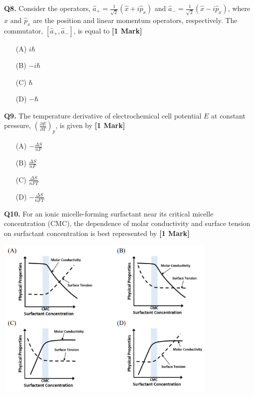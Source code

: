 \documentclass[11pt]{article}
\newcommand{\questiona}[2]{
    \noindent\textbf{Q#2.} #1 \hfill \textbf{[1 Mark]}
}
\begin{document}
\questiona{Consider the operators, \(\hat{a}_+ = \frac{1}{\sqrt{2}} (\hat{x} + i\hat{p}_x)\) and \(\hat{a}_- = \frac{1}{\sqrt{2}} (\hat{x} - i\hat{p}_x)\), where \(\hat{x}\) and \(\hat{p}_x\) are the position and linear momentum operators, respectively. The commutator, \([\hat{a}_+, \hat{a}_-]\), is equal to}{8}
\begin{enumerate}
    \item[(A)] \(i\hbar\)
    \item[(B)] \(-i\hbar\)
    \item[(C)] \(\hbar\)
    \item[(D)] \(-\hbar\)
\end{enumerate}
\vspace{0.5cm}

\questiona{The temperature derivative of electrochemical cell potential \(E\) at constant pressure, \(\left( \frac{\partial E}{\partial T} \right)_p\), is given by}{9}
\begin{enumerate}
    \item[(A)] \(-\frac{\Delta S}{nF}\)
    \item[(B)] \(\frac{\Delta S}{nF}\)
    \item[(C)] \(\frac{\Delta S}{nFT}\)
    \item[(D)] \(-\frac{\Delta S}{nFT}\)
\end{enumerate}
\vspace{0.5cm}

\questiona{For an ionic micelle-forming surfactant near its critical micelle concentration (CMC), the dependence of molar conductivity and surface tension on surfactant concentration is best represented by}{10}
\begin{center}
\includegraphics[width=0.8\textwidth]{figures/10a.png}
\end{center}
\vspace{0.5cm}
\end{document}
